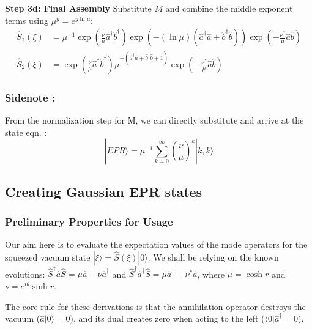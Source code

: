 {\textbf{Step 3d: Final Assembly}
Substitute $M$ and combine the middle exponent terms using $\mu^y = e^{y\ln\mu}$:
\begin{align}
\hat{S}_2(\xi) &= \mu^{-1} \exp\left(\frac{\nu}{\mu}\hat{a}^\dagger\hat{b}^\dagger\right) \exp\left(-(\ln\mu)(\hat{a}^\dagger\hat{a} + \hat{b}^\dagger\hat{b})\right) \exp\left(-\frac{\nu^*}{\mu}\hat{a}\hat{b}\right) \\
\hat{S}_2(\xi) &= \exp\left(\frac{\nu}{\mu}\hat{a}^\dagger\hat{b}^\dagger\right) \mu^{-(\hat{a}^\dagger\hat{a} + \hat{b}^\dagger\hat{b} + 1)} \exp\left(-\frac{\nu^*}{\mu}\hat{a}\hat{b}\right)
\end{align}

\subsubsection{Sidenote :}

From the normalization step for M, we can directly substitute and arrive at the state eqn. : 
\begin{equation}
|EPR\rangle= \mu^{-1} \sum_{k=0}^{\infty} \left(\frac{\nu}{\mu}\right)^k |k,k\rangle
\end{equation}

\subsection{Creating Gaussian EPR states}

\subsubsection{Preliminary Properties for Usage}

Our aim here is to evaluate the expectation values of the mode operators for the squeezed vacuum state $|\xi\rangle = \hat{S}(\xi)|0\rangle$. We shall be relying on the known evolutions: $\hat{S}^\dagger \hat{a} \hat{S} = \mu\hat{a} - \nu\hat{a}^\dagger$ and $\hat{S}^\dagger \hat{a}^\dagger \hat{S} = \mu\hat{a}^\dagger - \nu^*\hat{a}$, where $\mu = \cosh r$ and $\nu = e^{i\theta}\sinh r$. 

The core rule for these derivations is that the annihilation operator destroys the vacuum ($\hat{a}|0\rangle = 0$), and its dual creates zero when acting to the left ($\langle 0|\hat{a}^\dagger = 0$).

}
